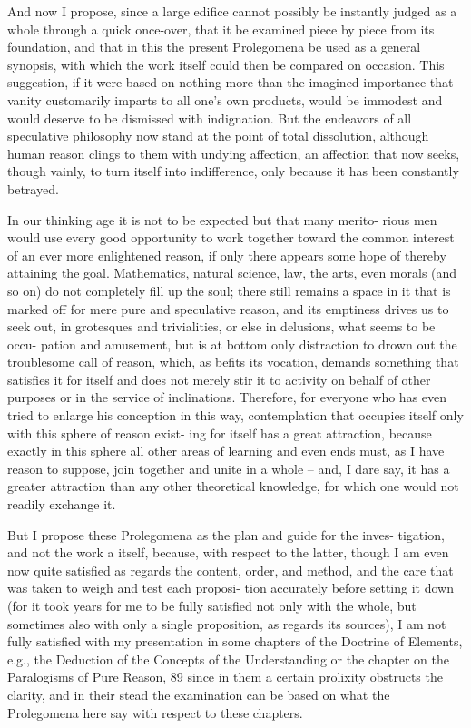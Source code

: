 And now I propose, since a large ediﬁce cannot possibly be instantly
judged as a whole through a quick once-over, that it be examined piece by
piece from its foundation, and that in this the present Prolegomena be used
as a general synopsis, with which the work itself could then be compared
on occasion. This suggestion, if it were based on nothing more than the
imagined importance that vanity customarily imparts to all one’s own
products, would be immodest and would deserve to be dismissed with
indignation. But the endeavors of all speculative philosophy now stand
at the point of total dissolution, although human reason clings to them
with undying affection, an affection that now seeks, though vainly, to turn
itself into indifference, only because it has been constantly betrayed.

In our thinking age it is not to be expected but that many merito-
rious men would use every good opportunity to work together toward
the common interest of an ever more enlightened reason, if only there
appears some hope of thereby attaining the goal. Mathematics, natural
science, law, the arts, even morals (and so on) do not completely ﬁll up
the soul; there still remains a space in it that is marked off for mere
pure and speculative reason, and its emptiness drives us to seek out, in
grotesques and trivialities, or else in delusions, what seems to be occu-
pation and amusement, but is at bottom only distraction to drown out
the troublesome call of reason, which, as beﬁts its vocation, demands
something that satisﬁes it for itself and does not merely stir it to activity
on behalf of other purposes or in the service of inclinations. Therefore,
for everyone who has even tried to enlarge his conception in this way,
contemplation that occupies itself only with this sphere of reason exist-
ing for itself has a great attraction, because exactly in this sphere all other
areas of learning and even ends must, as I have reason to suppose, join
together and unite in a whole – and, I dare say, it has a greater attraction
than any other theoretical knowledge, for which one would not readily
exchange it.

But I propose these Prolegomena as the plan and guide for the inves-
tigation, and not the work a itself, because, with respect to the latter,
though I am even now quite satisﬁed as regards the content, order, and
method, and the care that was taken to weigh and test each proposi-
tion accurately before setting it down (for it took years for me to be
fully satisﬁed not only with the whole, but sometimes also with only a
single proposition, as regards its sources), I am not fully satisﬁed with
my presentation in some chapters of the Doctrine of Elements, e.g., the
Deduction of the Concepts of the Understanding or the chapter on the
Paralogisms of Pure Reason, 89 since in them a certain prolixity obstructs
the clarity, and in their stead the examination can be based on what the
Prolegomena here say with respect to these chapters.

